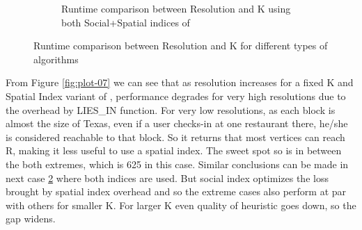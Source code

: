 \begin{figure}[t]
\begin{subfigure}[t]{0.23\textwidth}
		\caption{Runtime comparison between Resolution and K using both Social+Spatial indices of {\rrp}}
		\label{fig:plot-08}
	\end{subfigure}
	\caption{Runtime comparison between Resolution and K for different types of {\rrp} algorithms}
\end{figure}

From Figure \ref{fig:plot-07} we can see that as resolution increases for a fixed K and Spatial Index variant of {\rrp}, performance degrades for very high resolutions due to the overhead by LIES\_IN function. For very low resolutions, as each block is almost the size of Texas, even if a user checks-in at one restaurant there, he/she is considered reachable to that block. So it returns that most vertices can reach R, making it less useful to use a spatial index. The sweet spot so is in between the both extremes, which is 625 in this case. Similar conclusions can be made in next case \ref {fig:plot-08} where both indices are used. But social index optimizes the loss brought by spatial index overhead and so the extreme cases also perform at par with others for smaller K. For larger K even quality of heuristic goes down, so the gap widens.

